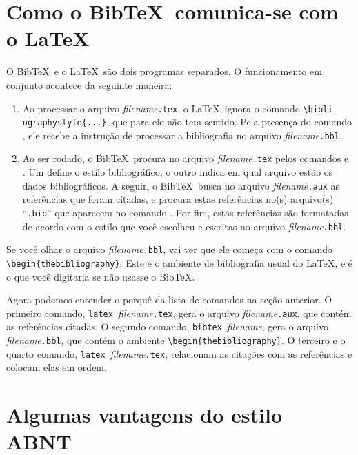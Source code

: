 \documentclass[a4paper,12pt]{article}
\newcommand{\ca}{\c{c}\~ao}
\newcommand{\co}{\c{c}\~oes}
\begin{document}
	\section{Como o Bib\TeX\ comunica-se com o \LaTeX }
	
	
	O Bib\TeX\ e o \LaTeX\ s\~ao dois programas separados.
	O funcionamento em conjunto acontece da seguinte maneira:
	\begin{enumerate}
		\item 
		Ao processar o arquivo {\it filename}\verb+.tex+,
		o \LaTeX\ ignora o comando \verb+\bibli+ \verb+ographystyle{...}+,
		que para ele n\~ao tem sentido. Pela presen\c{c}a do comando
		\verb++, ele recebe a instru{\ca} de processar a
		bibliografia no arquivo {\it filename}\verb+.bbl+. 
		\item
		Ao ser rodado, o Bib\TeX\, procura no arquivo
		{\it filename}\verb+.tex+ pelos comandos \verb++
		e \verb++. Um define o estilo bibliogr\'afico, o outro
		indica em qual arquivo est\~ao os dados bibliogr\'aficos.
		A seguir, o Bib\TeX\ busca no arquivo
		{\it filename}\verb+.aux+ as refer\^encias que foram citadas,
		e procura estas refer\^encias no(s) arquivo(s) ``\verb+.bib+'' que
		aparecem no comando \verb++.
		Por fim, estas refer\^encias s\~ao formatadas de acordo com o estilo que
		voc\^e escolheu e escritas no arquivo {\it filename}\verb+.bbl+.
	\end{enumerate}
	
	Se voc\^e olhar o arquivo {\it filename}\verb+.bbl+, 
	vai ver que ele come\c{c}a com o comando \verb+\begin{thebibliography}+.
		Este \'e o ambiente de bibliografia usual do \LaTeX , e \'e
		o que voc\^e digitaria se n\~ao usasse o Bib\TeX .
		
		Agora podemos entender o porqu\^e da lista de comandos na se{\ca}
		anterior. O primeiro comando, \verb+latex +{\it filename}\verb+.tex+,
		gera o arquivo {\it filename}\verb+.aux+, que cont\'em as refer\^encias
		citadas. O segundo comando, \verb+bibtex +{\it filename},
		gera o arquivo {\it filename}\verb+.bbl+, que cont\'em o ambiente
		\verb+\begin{thebibliography}+. O terceiro e o quarto comando,
			\verb+latex +{\it filename}\verb+.tex+, relacionam as cita{\co}
			com as refer\^encias e colocam elas em ordem.
			
			
			
			
			\section{Algumas vantagens do estilo ABNT}
			\label{sec_abnt}
			
\end{document}
